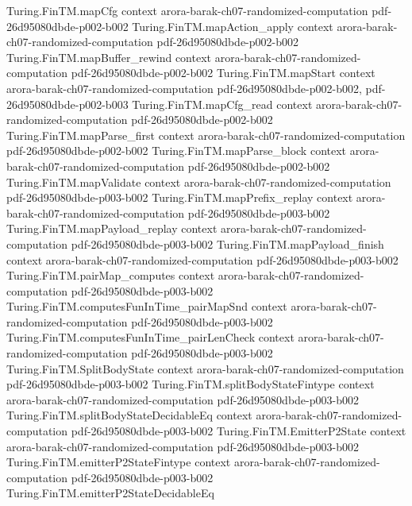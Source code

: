 \begin{theorem}
\proofstep
  {Turing.FinTM.mapCfg}
  {context}
  {arora-barak-ch07-randomized-computation}
  {pdf-26d95080dbde-p002-b002}
\proofstep
  {Turing.FinTM.mapAction_apply}
  {context}
  {arora-barak-ch07-randomized-computation}
  {pdf-26d95080dbde-p002-b002}
\proofstep
  {Turing.FinTM.mapBuffer_rewind}
  {context}
  {arora-barak-ch07-randomized-computation}
  {pdf-26d95080dbde-p002-b002}
\proofstep
  {Turing.FinTM.mapStart}
  {context}
  {arora-barak-ch07-randomized-computation}
  {pdf-26d95080dbde-p002-b002,
    pdf-26d95080dbde-p002-b003}
\proofstep
  {Turing.FinTM.mapCfg_read}
  {context}
  {arora-barak-ch07-randomized-computation}
  {pdf-26d95080dbde-p002-b002}
\proofstep
  {Turing.FinTM.mapParse_first}
  {context}
  {arora-barak-ch07-randomized-computation}
  {pdf-26d95080dbde-p002-b002}
\proofstep
  {Turing.FinTM.mapParse_block}
  {context}
  {arora-barak-ch07-randomized-computation}
  {pdf-26d95080dbde-p002-b002}
\proofstep
  {Turing.FinTM.mapValidate}
  {context}
  {arora-barak-ch07-randomized-computation}
  {pdf-26d95080dbde-p003-b002}
\proofstep
  {Turing.FinTM.mapPrefix_replay}
  {context}
  {arora-barak-ch07-randomized-computation}
  {pdf-26d95080dbde-p003-b002}
\proofstep
  {Turing.FinTM.mapPayload_replay}
  {context}
  {arora-barak-ch07-randomized-computation}
  {pdf-26d95080dbde-p003-b002}
\proofstep
  {Turing.FinTM.mapPayload_finish}
  {context}
  {arora-barak-ch07-randomized-computation}
  {pdf-26d95080dbde-p003-b002}
\proofstep
  {Turing.FinTM.pairMap_computes}
  {context}
  {arora-barak-ch07-randomized-computation}
  {pdf-26d95080dbde-p003-b002}
\proofstep
  {Turing.FinTM.computesFunInTime_pairMapSnd}
  {context}
  {arora-barak-ch07-randomized-computation}
  {pdf-26d95080dbde-p003-b002}
\proofstep
  {Turing.FinTM.computesFunInTime_pairLenCheck}
  {context}
  {arora-barak-ch07-randomized-computation}
  {pdf-26d95080dbde-p003-b002}
\proofstep
  {Turing.FinTM.SplitBodyState}
  {context}
  {arora-barak-ch07-randomized-computation}
  {pdf-26d95080dbde-p003-b002}
\proofstep
  {Turing.FinTM.splitBodyStateFintype}
  {context}
  {arora-barak-ch07-randomized-computation}
  {pdf-26d95080dbde-p003-b002}
\proofstep
  {Turing.FinTM.splitBodyStateDecidableEq}
  {context}
  {arora-barak-ch07-randomized-computation}
  {pdf-26d95080dbde-p003-b002}
\proofstep
  {Turing.FinTM.EmitterP2State}
  {context}
  {arora-barak-ch07-randomized-computation}
  {pdf-26d95080dbde-p003-b002}
\proofstep
  {Turing.FinTM.emitterP2StateFintype}
  {context}
  {arora-barak-ch07-randomized-computation}
  {pdf-26d95080dbde-p003-b002}
\proofstep
  {Turing.FinTM.emitterP2StateDecidableEq}

\end{theorem}
